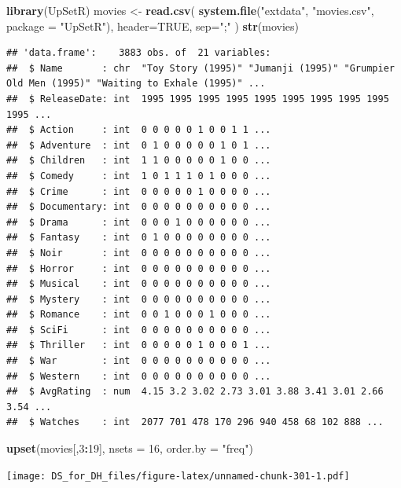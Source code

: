 \documentclass[
]{book}
\newenvironment{Shaded}{\begin{snugshade}}{\end{snugshade}}
\newcommand{\DataTypeTok}[1]{\textcolor[rgb]{0.13,0.29,0.53}{#1}}
\newcommand{\DecValTok}[1]{\textcolor[rgb]{0.00,0.00,0.81}{#1}}
\newcommand{\KeywordTok}[1]{\textcolor[rgb]{0.13,0.29,0.53}{\textbf{#1}}}
\newcommand{\NormalTok}[1]{#1}
\newcommand{\OperatorTok}[1]{\textcolor[rgb]{0.81,0.36,0.00}{\textbf{#1}}}
\newcommand{\OtherTok}[1]{\textcolor[rgb]{0.56,0.35,0.01}{#1}}
\newcommand{\StringTok}[1]{\textcolor[rgb]{0.31,0.60,0.02}{#1}}
\begin{document}
\begin{Shaded}
\begin{Highlighting}[]
\KeywordTok{library}\NormalTok{(UpSetR)}
\NormalTok{movies <-}\StringTok{ }\KeywordTok{read.csv}\NormalTok{( }\KeywordTok{system.file}\NormalTok{(}\StringTok{"extdata"}\NormalTok{, }\StringTok{"movies.csv"}\NormalTok{, }\DataTypeTok{package =} \StringTok{"UpSetR"}\NormalTok{), }\DataTypeTok{header=}\OtherTok{TRUE}\NormalTok{, }\DataTypeTok{sep=}\StringTok{";"}\NormalTok{ )}
\KeywordTok{str}\NormalTok{(movies)}
\end{Highlighting}
\end{Shaded}

\begin{verbatim}
## 'data.frame':    3883 obs. of  21 variables:
##  $ Name       : chr  "Toy Story (1995)" "Jumanji (1995)" "Grumpier Old Men (1995)" "Waiting to Exhale (1995)" ...
##  $ ReleaseDate: int  1995 1995 1995 1995 1995 1995 1995 1995 1995 1995 ...
##  $ Action     : int  0 0 0 0 0 1 0 0 1 1 ...
##  $ Adventure  : int  0 1 0 0 0 0 0 1 0 1 ...
##  $ Children   : int  1 1 0 0 0 0 0 1 0 0 ...
##  $ Comedy     : int  1 0 1 1 1 0 1 0 0 0 ...
##  $ Crime      : int  0 0 0 0 0 1 0 0 0 0 ...
##  $ Documentary: int  0 0 0 0 0 0 0 0 0 0 ...
##  $ Drama      : int  0 0 0 1 0 0 0 0 0 0 ...
##  $ Fantasy    : int  0 1 0 0 0 0 0 0 0 0 ...
##  $ Noir       : int  0 0 0 0 0 0 0 0 0 0 ...
##  $ Horror     : int  0 0 0 0 0 0 0 0 0 0 ...
##  $ Musical    : int  0 0 0 0 0 0 0 0 0 0 ...
##  $ Mystery    : int  0 0 0 0 0 0 0 0 0 0 ...
##  $ Romance    : int  0 0 1 0 0 0 1 0 0 0 ...
##  $ SciFi      : int  0 0 0 0 0 0 0 0 0 0 ...
##  $ Thriller   : int  0 0 0 0 0 1 0 0 0 1 ...
##  $ War        : int  0 0 0 0 0 0 0 0 0 0 ...
##  $ Western    : int  0 0 0 0 0 0 0 0 0 0 ...
##  $ AvgRating  : num  4.15 3.2 3.02 2.73 3.01 3.88 3.41 3.01 2.66 3.54 ...
##  $ Watches    : int  2077 701 478 170 296 940 458 68 102 888 ...
\end{verbatim}

\begin{Shaded}
\begin{Highlighting}[]
\KeywordTok{upset}\NormalTok{(movies[,}\DecValTok{3}\OperatorTok{:}\DecValTok{19}\NormalTok{], }\DataTypeTok{nsets =} \DecValTok{16}\NormalTok{, }\DataTypeTok{order.by =} \StringTok{"freq"}\NormalTok{)}
\end{Highlighting}
\end{Shaded}

\texttt{[image: DS\_for\_DH\_files/figure-latex/unnamed-chunk-301-1.pdf]}
\end{document}
